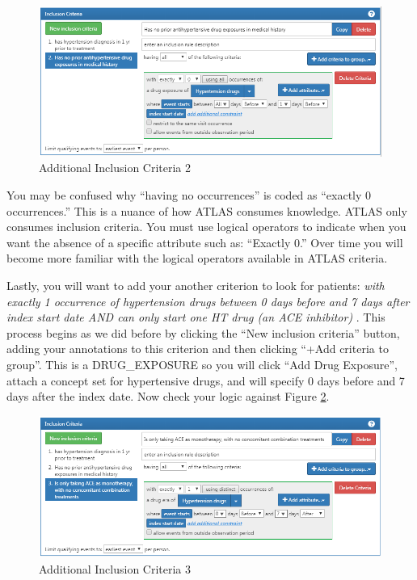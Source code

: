 \documentclass[11pt]{book}
\theoremstyle{definition}
\theoremstyle{definition}
\theoremstyle{definition}
\theoremstyle{remark}
\begin{document}
\begin{figure}

{\centering \includegraphics[width=1\linewidth]{images/Cohorts/ATLAS-IC2} 

}

\caption{Additional Inclusion Criteria 2}\label{fig:ATLASIC2}
\end{figure}

You may be confused why ``having no occurrences'' is coded as ``exactly 0 occurrences.'' This is a nuance of how ATLAS consumes knowledge. ATLAS only consumes inclusion criteria. You must use logical operators to indicate when you want the absence of a specific attribute such as: ``Exactly 0.'' Over time you will become more familiar with the logical operators available in ATLAS criteria.

Lastly, you will want to add your another criterion to look for patients: \emph{with exactly 1 occurrence of hypertension drugs between 0 days before and 7 days after index start date AND can only start one HT drug (an ACE inhibitor)} . This process begins as we did before by clicking the ``New inclusion criteria'' button, adding your annotations to this criterion and then clicking ``+Add criteria to group''. This is a DRUG\_EXPOSURE so you will click ``Add Drug Exposure'', attach a concept set for hypertensive drugs, and will specify 0 days before and 7 days after the index date. Now check your logic against Figure \ref{fig:ATLASIC3}.

\begin{figure}

{\centering \includegraphics[width=1\linewidth]{images/Cohorts/ATLAS-IC3} 

}

\caption{Additional Inclusion Criteria 3}\label{fig:ATLASIC3}
\end{figure}
\end{document}
